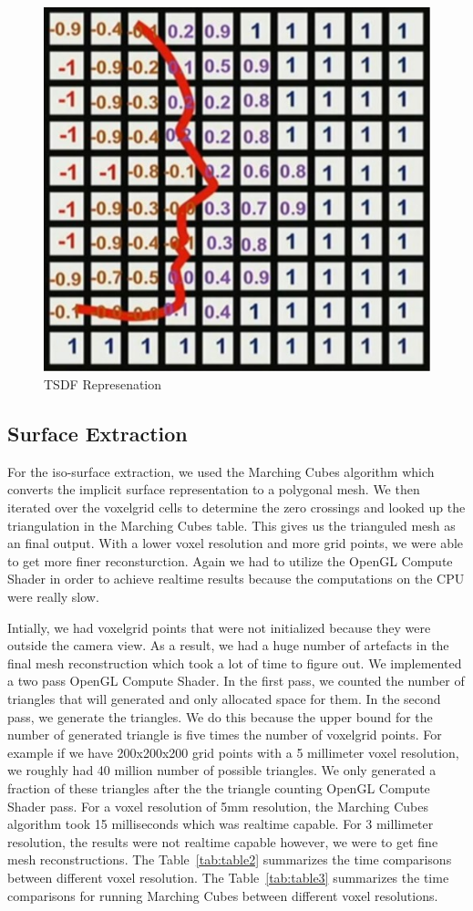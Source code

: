 \documentclass[10pt,twocolumn,letterpaper]{article}
\begin{document}
\begin{figure}[t]
\begin{center}
\includegraphics[width=0.6\linewidth]{imgs/tsdf}
\end{center}
 \caption{TSDF Represenation}
\end{figure}

\subsection{Surface Extraction}
For the iso-surface extraction, we used the Marching Cubes algorithm which converts the implicit surface representation to a polygonal mesh. We then iterated over the voxelgrid cells to determine the zero crossings and looked up the triangulation in the Marching Cubes table. This gives us the trianguled mesh as an final output. With a lower voxel resolution and more grid points, we were able to get more finer reconsturction. Again we had to utilize the OpenGL Compute Shader in order to achieve realtime results because the computations on the CPU were really slow.

Intially, we had voxelgrid points that were not initialized because they were outside the camera view. As a result, we had a huge number of artefacts in the final mesh reconstruction which took a lot of time to figure out. We implemented a two pass OpenGL Compute Shader. In the first pass, we counted the number of triangles that will generated and only allocated space for them. In the second pass, we generate the triangles. We do this because the upper bound for the number of generated triangle is five times the number of voxelgrid points. For example if we have 200x200x200 grid points with a 5 millimeter voxel resolution, we roughly had 40 million number of possible triangles. We only generated a fraction of these triangles after the the triangle counting OpenGL Compute Shader pass. For a voxel resolution of 5mm resolution, the Marching Cubes algorithm took 15 milliseconds which was realtime capable. For 3 millimeter resolution, the results were not realtime capable however, we were to get fine mesh reconstructions.  The Table~\ref{tab:table2} summarizes the time comparisons between different voxel resolution. The Table~\ref{tab:table3} summarizes the time comparisons for running Marching Cubes between different voxel resolutions. 
\end{document}

